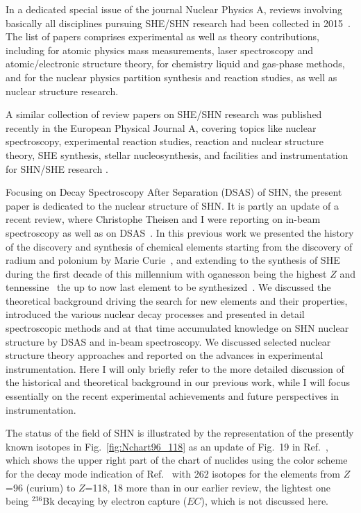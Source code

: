In a dedicated special issue of the journal Nuclear Physics A, reviews involving basically all disciplines pursuing SHE/SHN research had been collected in 2015~\cite{NPA944}. 
The list of papers comprises experimental as well as theory contributions, including for atomic physics mass measurements, laser spectroscopy and atomic/electronic structure theory, for chemistry liquid and gas-phase methods, and for the nuclear physics partition synthesis and reaction studies, as well as nuclear structure research. 

A similar collection of review papers on SHE/SHN research was published recently in the European Physical Journal A, covering topics like nuclear spectroscopy, experimental reaction studies, reaction and nuclear structure theory, SHE synthesis, stellar nucleosynthesis, and facilities and instrumentation for SHN/SHE research \cite{EPJA_SHE_2025}.


Focusing on Decay Spectroscopy After Separation (DSAS) of SHN, the present paper is dedicated to the nuclear structure of SHN. It is partly an update of a recent review, where Christophe Theisen and I were reporting on in-beam spectroscopy as well as on DSAS~\cite{Ackermann2017}. 
In this previous work we presented the history of the discovery and synthesis of chemical elements starting from the discovery of radium and polonium by Marie Curie~\cite{Curie1898,Curie1898a}, and extending to the synthesis of SHE during the first decade of this millennium with oganesson being the highest $Z$ and tennessine~\cite{Oganessian2010} the up to now last element to be synthesized~\cite{Oganessian2006}. We discussed the theoretical background driving the search for new elements and their properties, introduced the various nuclear decay processes and presented in detail spectroscopic methods and at that time accumulated knowledge on SHN nuclear structure by DSAS and in-beam spectroscopy. 
We discussed selected nuclear structure theory approaches and reported on the advances in experimental instrumentation. 
Here I will only briefly refer to the more detailed discussion of the historical and theoretical background in our previous work, while I will focus essentially on the recent experimental achievements and future perspectives in instrumentation.

The status of the field of SHN is illustrated by the representation of the presently known isotopes in Fig.~\ref{fig:Nchart96_118} as an update of Fig.~19 in Ref.~\cite{Ackermann2017}, which shows the upper right part of the chart of nuclides using the color scheme for the decay mode indication of Ref.~\cite{Soti2024} with 262 isotopes for the elements from $Z$=96 (curium) to $Z$=118, 18 more than in our earlier review, the lightest one being $^{236}$Bk decaying by electron capture ($EC$), which is not discussed here.

